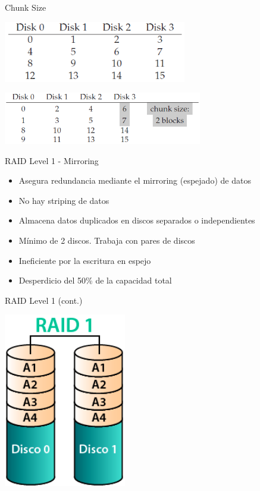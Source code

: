 \begin{frame}{Chunk Size}
 \begin{center}
  \includegraphics[width=0.6\textwidth]{images/chunk1.png}
 \end{center}
 \begin{center}
  \includegraphics[width=0.65\textwidth]{images/chunk2.png}
 \end{center}
\end{frame}

\begin{frame}{RAID Level 1 - Mirroring}
 \begin{itemize}
  \item Asegura redundancia mediante el mirroring (espejado) de datos
  \item No hay striping de datos
  \item Almacena datos duplicados en discos separados o independientes
  \item Mínimo de 2 discos. Trabaja con pares de discos
  \item Ineficiente por la escritura en espejo
  \item Desperdicio del 50\% de la capacidad total
 \end{itemize}
\end{frame}

\begin{frame}{RAID Level 1 (cont.)}
 \begin{center}
  \includegraphics[width=0.4\textwidth]{images/raid1.png}
 \end{center}
\end{frame}

